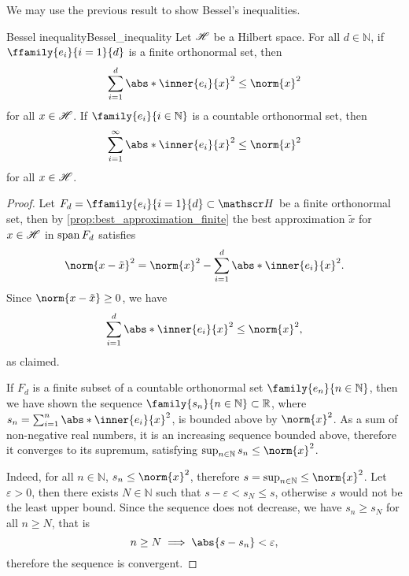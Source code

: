 We may use the previous result to show Bessel's inequalities.
\begin{lemma}{Bessel inequality}{Bessel_inequality}
    Let \(\mathscr{H}\) be a Hilbert space. For all \(d \in \mathbb{N}\), if \(\ffamily{e_i}{i=1}{d}\) is a finite orthonormal set, then
    \begin{equation*}
        \sum_{i=1}^d \abs*{\inner{e_i}{x}}^2 \leq \norm{x}^2
    \end{equation*}
    for all \(x \in \mathscr{H}\). If \(\family{e_i}{i\in \mathbb{N}}\) is a countable orthonormal set, then
    \begin{equation*}
        \sum_{i=1}^\infty \abs*{\inner{e_i}{x}}^2 \leq \norm{x}^2
    \end{equation*}
    for all \(x \in \mathscr{H}\).
\end{lemma}
\begin{proof}
    Let \(F_d = \ffamily{e_i}{i=1}{d}\subset \hilbert\) be a finite orthonormal set, then by \cref{prop:best_approximation_finite} the best approximation \(\tilde{x}\) for \(x \in \mathscr{H}\) in \(\operatorname{span}{F_d}\) satisfies
    \begin{equation*}
        \norm{x - \tilde{x}}^2 = \norm{x}^2 - \sum_{i=1}^d \abs*{\inner{e_i}{x}}^2.
    \end{equation*}
    Since \(\norm{x - \tilde{x}} \geq 0\), we have
    \begin{equation*}
        \sum_{i=1}^d \abs*{\inner{e_i}{x}}^2 \leq \norm{x}^2,
    \end{equation*}
    as claimed.

    If \(F_d\) is a finite subset of a countable orthonormal set \(\family{e_n}{n\in \mathbb{N}}\), then we have shown the sequence \(\family{s_n}{n\in \mathbb{N}} \subset \mathbb{R}\), where \(s_n = \sum_{i=1}^n \abs*{\inner{e_i}{x}}^2\), is bounded above by \(\norm{x}^2\). As a sum of non-negative real numbers, it is an increasing sequence bounded above, therefore it converges to its supremum, satisfying \(\sup_{n \in \mathbb{N}} s_n \leq \norm{x}^2\).

    Indeed, for all \(n \in \mathbb{N}\), \(s_n \leq \norm{x}^2\), therefore \(s = \sup_{n\in \mathbb{N}} \leq \norm{x}^2\). Let \(\varepsilon > 0\), then there exists \(N \in \mathbb{N}\) such that \(s - \varepsilon < s_N \leq s\), otherwise \(s\) would not be the least upper bound. Since the sequence does not decrease, we have \(s_n \geq s_N\) for all \(n \geq N\), that is
    \begin{equation*}
        n \geq N \implies \abs{s - s_n} < \varepsilon,
    \end{equation*}
    therefore the sequence is convergent.
\end{proof}


